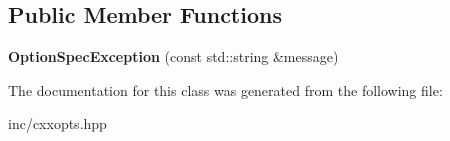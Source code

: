 \subsection*{Public Member Functions}
\begin{DoxyCompactItemize}
\item 
{\bfseries Option\+Spec\+Exception} (const std\+::string \&message)\hypertarget{classcxxopts_1_1OptionSpecException_a0bea2dfad20862c59c70311246fcb354}{}\label{classcxxopts_1_1OptionSpecException_a0bea2dfad20862c59c70311246fcb354}

\end{DoxyCompactItemize}


The documentation for this class was generated from the following file\+:\begin{DoxyCompactItemize}
\item 
inc/cxxopts.\+hpp\end{DoxyCompactItemize}
